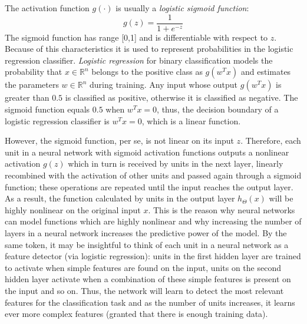 The activation function $g(\cdot)$ is usually a \emph{logistic sigmoid function}:
\begin{equation}
	g(z) = \frac{1}{1+ e^{-z}}
\end{equation}
The sigmoid function has range [0,1] and is differentiable with respect to $z$. Because of this characteristics it is used to represent probabilities in the logistic regression classifier. \emph{Logistic regression} for binary classification models the probability that $x \in \mathbb{R}^n$ belongs to the positive class as $g(w^Tx)$ and estimates the parameters $w \in \mathbb{R}^n$ during training. Any input whose output $g(w^Tx)$ is greater than $0.5$ is classified as positive, otherwise it is classified as negative. The sigmoid function equals $0.5$ when $w^Tx = 0$, thus, the decision boundary of a logistic regression classifier is $w^Tx = 0$, which is a linear function. 

However, the sigmoid function, per se, is not linear on its input $z$. Therefore, each unit in a neural network with sigmoid activation functions outputs a nonlinear activation $g(z)$ which in turn is received by units in the next layer, linearly recombined with the activation of other units and passed again through a sigmoid function; these operations are repeated until the input reaches the output layer. As a result, the function calculated by units in the output layer $h_\Theta(x)$ will be highly nonlinear on the original input $x$. This is the reason why neural networks can model functions which are highly nonlinear and why increasing the number of layers in a neural network increases the predictive power of the model. By the same token, it may be insightful to think of each unit in a neural network as a feature detector (via logistic regression): units in the first hidden layer are trained to activate when simple features are found on the input, units on the second hidden layer activate when a combination of these simple features is present on the input and so on. Thus, the network will learn to detect the most relevant features for the classification task and as the number of units increases, it learns ever more complex features (granted that there is enough training data).


